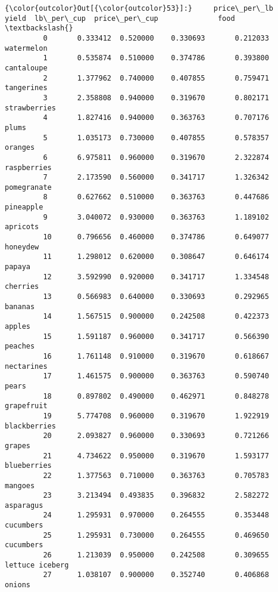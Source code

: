 \documentclass[11pt]{article}
\begin{document}
\begin{Verbatim}[commandchars=\\\{\}]
{\color{outcolor}Out[{\color{outcolor}53}]:}     price\_per\_lb     yield  lb\_per\_cup  price\_per\_cup              food  \textbackslash{}
         0       0.333412  0.520000    0.330693       0.212033        watermelon   
         1       0.535874  0.510000    0.374786       0.393800        cantaloupe   
         2       1.377962  0.740000    0.407855       0.759471        tangerines   
         3       2.358808  0.940000    0.319670       0.802171      strawberries   
         4       1.827416  0.940000    0.363763       0.707176             plums   
         5       1.035173  0.730000    0.407855       0.578357           oranges   
         6       6.975811  0.960000    0.319670       2.322874       raspberries   
         7       2.173590  0.560000    0.341717       1.326342       pomegranate   
         8       0.627662  0.510000    0.363763       0.447686         pineapple   
         9       3.040072  0.930000    0.363763       1.189102          apricots   
         10      0.796656  0.460000    0.374786       0.649077          honeydew   
         11      1.298012  0.620000    0.308647       0.646174            papaya   
         12      3.592990  0.920000    0.341717       1.334548          cherries   
         13      0.566983  0.640000    0.330693       0.292965           bananas   
         14      1.567515  0.900000    0.242508       0.422373            apples   
         15      1.591187  0.960000    0.341717       0.566390           peaches   
         16      1.761148  0.910000    0.319670       0.618667        nectarines   
         17      1.461575  0.900000    0.363763       0.590740             pears   
         18      0.897802  0.490000    0.462971       0.848278        grapefruit   
         19      5.774708  0.960000    0.319670       1.922919      blackberries   
         20      2.093827  0.960000    0.330693       0.721266            grapes   
         21      4.734622  0.950000    0.319670       1.593177       blueberries   
         22      1.377563  0.710000    0.363763       0.705783           mangoes   
         23      3.213494  0.493835    0.396832       2.582272         asparagus   
         24      1.295931  0.970000    0.264555       0.353448         cucumbers   
         25      1.295931  0.730000    0.264555       0.469650         cucumbers   
         26      1.213039  0.950000    0.242508       0.309655   lettuce iceberg   
         27      1.038107  0.900000    0.352740       0.406868            onions   

\end{Verbatim}
\end{document}
